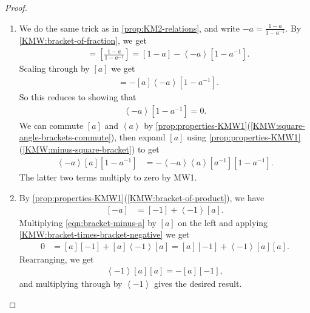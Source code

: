 \documentclass[11pt,openany]{book}
\begin{document}
\begin{proof} $\ $
\begin{enumerate}
    \item We do the same trick as in \autoref{prop:KM2-relations}, and write $-a = \frac{1-a}{1-a^{-1}}$. By \autoref{KMW:bracket-of-fraction}, we get
    \begin{align*}
        [-a] &= [\frac{1-a}{1-a^{-1}}] = [1-a] - \left\langle -a \right\rangle[1-a^{-1}].
    \end{align*}
    Scaling through by $[a]$ we get
    \begin{align*}
        [a][-a] &= - [a] \left\langle -a \right\rangle[1-a^{-1}].
    \end{align*}
    So this reduces to showing that
    \begin{align*}
        [a]\left\langle -a \right\rangle[1-a^{-1}] = 0.
    \end{align*}
    We can commute $[a]$ and $\left\langle a \right\rangle$ by \autoref{prop:properties-KMW1}(\ref{KMW:square-angle-brackets-commute}), then expand $[a]$ using \autoref{prop:properties-KMW1}(\ref{KMW:minus-square-bracket}) to get
    \begin{align*}
        \left\langle -a \right\rangle[a][1-a^{-1}] &= -\left\langle -a \right\rangle \left\langle a \right\rangle [a^{-1}][1-a^{-1}].
    \end{align*}
    The latter two terms multiply to zero by MW1.
    
    \item By \autoref{prop:properties-KMW1}(\ref{KMW:bracket-of-product}), we have
    \begin{equation}\label{eqn:bracket-minus-a}
    \begin{aligned}
        [-a] &= [-1] + \left\langle -1 \right\rangle[a].
    \end{aligned}
    \end{equation}
    Multiplying \autoref{eqn:bracket-minus-a} by $[a]$ on the left and applying \ref{KMW:bracket-times-bracket-negative} we get
    \begin{align*}
        0 &= [a][-1] + [a]\left\langle -1 \right\rangle[a] = [a][-1] +\left\langle -1 \right\rangle[a][a].
    \end{align*}
    Rearranging, we get
    \begin{align*}
        \left\langle -1 \right\rangle[a][a] = -  [a][-1],
    \end{align*}
    and multiplying through by $\left\langle -1 \right\rangle$ gives the desired result.


\end{enumerate}
\end{proof}
\end{document}
